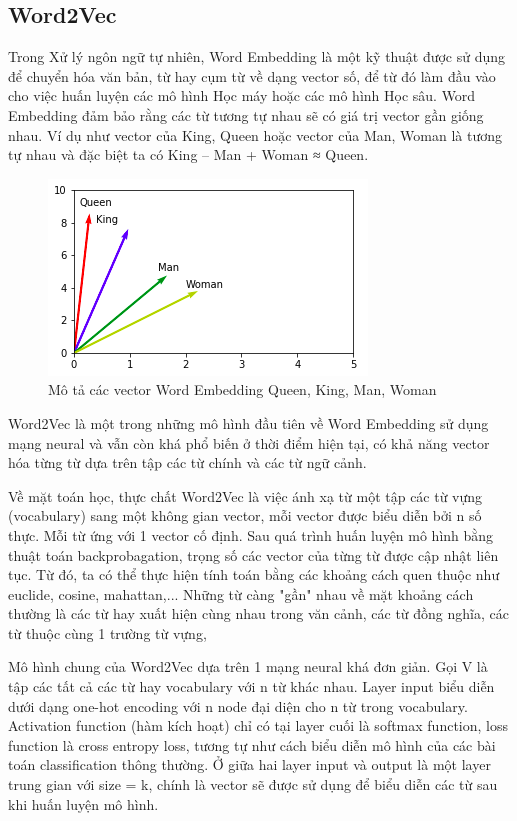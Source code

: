 \documentclass[12pt,a4paper,oneside]{book}
\begin{document}
			
	\subsection{Word2Vec}
	
	Trong Xử lý ngôn ngữ tự nhiên, Word Embedding là một kỹ thuật được sử dụng để chuyển hóa văn bản, từ hay cụm từ về dạng vector số, để từ đó làm đầu vào cho việc huấn luyện các mô hình Học máy hoặc các mô hình Học sâu. Word Embedding đảm bảo rằng các từ tương tự nhau sẽ có giá trị vector gần giống nhau. Ví dụ như vector của King, Queen hoặc vector của Man, Woman là tương tự nhau và đặc biệt ta có King – Man + Woman ≈ Queen.
	
	\begin{figure}[H]
		\begin{center}
			\includegraphics[width=0.8\columnwidth]{wordembedding}
		\end{center}
		\caption{Mô tả các vector Word Embedding Queen, King, Man, Woman}
	\end{figure}
	
	Word2Vec là một trong những mô hình đầu tiên về Word Embedding sử dụng mạng neural và vẫn còn khá phổ biến ở thời điểm hiện tại, có khả năng vector hóa từng từ dựa trên tập các từ chính và các từ ngữ cảnh.
	
	Về mặt toán học, thực chất Word2Vec là việc ánh xạ từ một tập các từ vựng (vocabulary) sang một không gian vector, mỗi vector được biểu diễn bởi n số thực. Mỗi từ ứng với 1 vector cố định. Sau quá trình huấn luyện mô hình bằng thuật toán backprobagation, trọng số các vector của từng từ được cập nhật liên tục. Từ đó, ta có thể thực hiện tính toán bằng các khoảng cách quen thuộc như euclide, cosine, mahattan,... Những từ càng "gần" nhau về mặt khoảng cách thường là các từ hay xuất hiện cùng nhau trong văn cảnh, các từ đồng nghĩa, các từ thuộc cùng 1 trường từ vựng,
	
	Mô hình chung của Word2Vec dựa trên 1 mạng neural khá đơn giản. Gọi V là tập các tất cả các từ hay vocabulary với n từ khác nhau. Layer input biểu diễn dưới dạng one-hot encoding với n node đại diện cho n từ trong vocabulary. Activation function (hàm kích hoạt) chỉ có tại layer cuối là softmax function, loss function là cross entropy loss, tương tự như cách biểu diễn mô hình của các bài toán classification thông thường. Ở giữa hai layer input và output là một layer trung gian với size = k, chính là vector sẽ được sử dụng để biểu diễn các từ sau khi huấn luyện mô hình.
	
\end{document}
